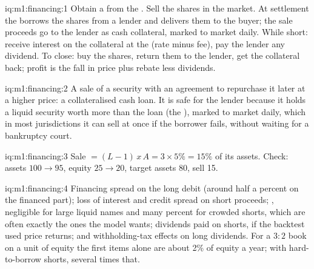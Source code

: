 \begin{solution}{iq:m1:financing:1}
Obtain a  from the . Sell the shares in the market. At
settlement the  borrows the shares from a lender and delivers
them to the buyer; the sale proceeds go to the lender as cash collateral,
marked to market daily. While short: receive interest on the collateral at
the  (rate minus fee), pay the lender any dividend. To close: buy
the shares, return them to the lender, get the collateral back; profit is
the fall in price plus rebate less dividends.
\end{solution}

\begin{solution}{iq:m1:financing:2}
A sale of a security with an agreement to repurchase it later at a higher
price: a collateralised cash loan. It is safe for the lender because it
holds a liquid security worth more than the loan (the ), marked to
market daily, which in most jurisdictions it can sell at once if the
borrower fails, without waiting for a bankruptcy court.
\end{solution}

\begin{solution}{iq:m1:financing:3}
Sale $= (L-1)\,x\,A = 3 \times 5\% = 15\%$ of its assets. Check: assets
$100 \to 95$, equity $25 \to 20$, target assets 80, sell 15.
\end{solution}

\begin{solution}{iq:m1:financing:4}
Financing spread on the long debit (around half a percent on the financed
part); loss of interest and credit spread on short proceeds; ,
negligible for large liquid names and many percent for crowded shorts, which
are often exactly the ones the model wants; dividends paid on shorts, if the
backtest used price returns; and withholding-tax effects on long dividends. For
a $3{:}2$ book on a unit of equity the first items alone are about 2\% of
equity a year; with hard-to-borrow shorts, several times that.
\end{solution}

